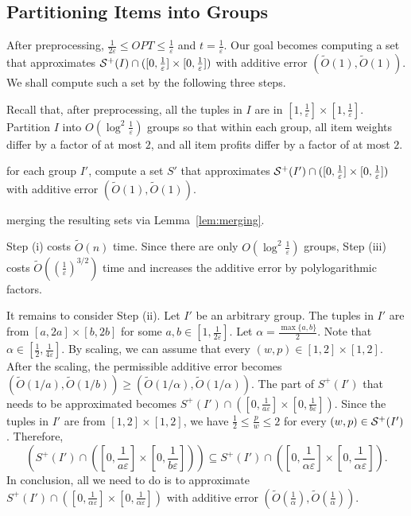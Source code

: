 \documentclass[a4paper,UKenglish,cleveref, autoref, thm-restate, pdfa]{lipics-v2021}
\newcommand{\eps}{\varepsilon}
\renewcommand{\leq}{\leqslant}
\renewcommand{\geq}{\geqslant}
\begin{document}
\subsection{Partitioning Items into Groups}
After preprocessing, $\frac{1}{2\eps} \leq OPT \leq \frac{1}{\eps}$ and $t = \frac{1}{\eps}$. Our goal becomes computing a set that approximates ${\cal S}^+(I) \cap ([0, \frac{1}{\eps}]\times [0, \frac{1}{\eps}])$ with additive error $(\tilde{O}(1), \tilde{O}(1))$.  We shall compute such a set by the following three steps.
\begin{romanenumerate} 
    \item Recall that, after preprocessing, all the tuples in $I$ are in $[1, \frac{1}{\eps}] \times [1, \frac{1}{\eps}]$. Partition $I$ into $O(\log^2 \frac{1}{\eps})$ groups so that within each group, all item weights differ by a factor of at most $2$, and all item profits differ by a factor of at most $2$.

    \item for each group $I'$, compute a set $S'$ that approximates ${\cal S}^+(I') \cap ([0, \frac{1}{\eps}]\times [0, \frac{1}{\eps}])$ with additive error $(\tilde{O}(1), \tilde{O}(1))$. 

    \item merging the resulting sets via Lemma~\ref{lem:merging}.
\end{romanenumerate}
Step (i) costs $\tilde{O}(n)$ time. Since there are only $O(\log^2 \frac{1}{\eps})$ groups, Step (iii) costs $\tilde{O}((\frac{1}{\eps})^{3/2})$ time and increases the additive error by polylogarithmic factors.

It remains to consider Step (ii). Let $I'$ be an arbitrary group.  The tuples in $I'$ are from $[a, 2a]\times [b, 2b]$ for some $a,b \in [1, \frac{1}{2\eps}]$. Let $\alpha = \frac{\max\{a, b\}}{2}$. Note that $\alpha \in [\frac{1}{2},\frac{1}{4\eps}]$. By scaling, we can assume that every $(w, p) \in [1, 2] \times [1,2]$. After the scaling, the permissible additive error becomes $(\tilde{O}(1/a), \tilde{O}(1/b)) \geq (\tilde{O}(1/\alpha), \tilde{O}(1/\alpha))$. The part of $S^+(I')$ that needs to be approximated becomes $S^+(I') \cap ([0, \frac{1}{a\eps}]\times [0, \frac{1}{b\eps}])$.  Since the tuples in $I'$ are from $[1, 2] \times [1,2]$, we have $\frac{1}{2} \leq \frac{p}{w} \leq 2$ for every $(w, p) \in {\cal S}^+(I')$.  Therefore, 
\[
    (S^+(I') \cap ([0, \frac{1}{a\eps}]\times [0, \frac{1}{b\eps}])) \subseteq 
    S^+(I') \cap ([0, \frac{1}{\alpha\eps}]\times [0, \frac{1}{\alpha\eps}]).
\]
In conclusion, all we need to do is to approximate $S^+(I') \cap ([0, \frac{1}{\alpha\eps}]\times [0, \frac{1}{\alpha\eps}])$ with additive error $(\tilde{O}(\frac{1}{\alpha}), \tilde{O}(\frac{1}{\alpha}))$.
\end{document}
